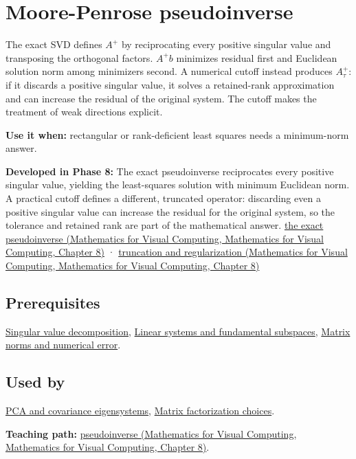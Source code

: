 \hypertarget{appendix-541306fdbc1b}{}\label{referencestart:appendix-541306fdbc1b}
\section{Moore-Penrose pseudoinverse}\label{appendix-541306fdbc1b-moore-penrose-pseudoinverse}

The exact SVD defines \(A^+\) by reciprocating every positive singular value and transposing the orthogonal factors. \(A^+b\) minimizes residual first and Euclidean solution norm among minimizers second. A numerical cutoff instead produces \(A_\tau^+\): if it discards a positive singular value, it solves a retained-rank approximation and can increase the residual of the original system. The cutoff makes the treatment of weak directions explicit.

\textbf{Use it when:} rectangular or rank-deficient least squares needs a minimum-norm answer.

\textbf{Developed in Phase 8:} The exact pseudoinverse reciprocates every positive singular value, yielding the least-squares solution with minimum Euclidean norm. A practical cutoff defines a different, truncated operator: discarding even a positive singular value can increase the residual for the original system, so the tolerance and retained rank are part of the mathematical answer. \href{../02-Mathematics-for-Visual-Computing/main.pdf\#nameddest=02-foundations-ii-ch024-the-moorepenrose-inverse-and-its-four-identities}{the exact pseudoinverse (Mathematics for Visual Computing, Mathematics for Visual Computing, Chapter 8)} · \href{../02-Mathematics-for-Visual-Computing/main.pdf\#nameddest=02-foundations-ii-ch024-thresholding-and-regularization-are-different-choices}{truncation and regularization (Mathematics for Visual Computing, Mathematics for Visual Computing, Chapter 8)}

\subsection{Prerequisites}\label{appendix-541306fdbc1b-prerequisites}

\hyperref[appendix-1fad5e7f36fa]{Singular value decomposition}, \hyperref[appendix-8572a4a060c1]{Linear systems and fundamental subspaces}, \hyperref[appendix-f8657bac66e5]{Matrix norms and numerical error}.

\subsection{Used by}\label{appendix-541306fdbc1b-used-by}

\hyperref[appendix-ad175ef3c5bf]{PCA and covariance eigensystems}, \hyperref[appendix-221a483bec2d]{Matrix factorization choices}.

\textbf{Teaching path:} \href{../02-Mathematics-for-Visual-Computing/main.pdf\#nameddest=02-foundations-ii-ch024-pseudoinverse-makes-least-squares-and-minimum-norm-one-operation}{pseudoinverse (Mathematics for Visual Computing, Mathematics for Visual Computing, Chapter 8)}.
